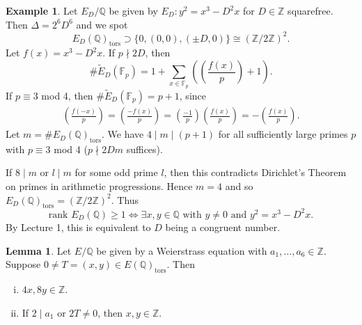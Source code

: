 \documentclass{article}
\theoremstyle{definition}
\newtheorem{lemma}[theorem]{Lemma}
\newtheorem{example}{Example}[section]
\begin{document}
\begin{example}
    Let $E_D/\mathbb{Q}$ be given by $E_D: y^2=x^3-D^2x$ for $D \in \mathbb{Z}$ squarefree. Then $\Delta=2^6 D^6$ and we spot \[
    E_D(\mathbb{Q})_{\text{tors}} \supset \{0, (0,0), (\pm D,0)\} \cong (\mathbb{Z}/2\mathbb{Z})^2.
    \]
    Let $f(x)=x^3-D^2x$. If $p \nmid 2D$, then $$\# \widetilde{E}_D(\mathbb{F}_p) = 1 + \sum_{x \in \mathbb{F}_p}^{} \left(\left(\frac{f(x)}{p}\right)+1\right).$$ If $p \equiv 3$ mod 4, then $\# \widetilde{E}_D(\mathbb{F}_p)=p+1$, since 
    \begin{align*}
        \left( \frac{f(-x)}{p} \right) = \left( \frac{-f(x)}{p} \right) = \left( \frac{-1}{p} \right) \left( \frac{f(x)}{p} \right) = - \left( \frac{f(x)}{p} \right).
    \end{align*}
    Let $m = \#E_D(\mathbb{Q})_{\text{tors}}$. We have $4 \mid m \mid (p+1)$ for all sufficiently large primes $p$ with $p \equiv 3$ mod 4 ($p \nmid 2Dm$ suffices).
    \vspace{1mm}
     
    If $8 \mid m$ or $l \mid m$ for some odd prime $l$, then this contradicts Dirichlet's Theorem on primes in arithmetic progressions. Hence $m=4$ and so $E_D(\mathbb{Q})_{\text{tors}} = (\mathbb{Z}/2\mathbb{Z})^2$. Thus 
    \[
    \text{rank }E_D(\mathbb{Q})\ge 1 \iff \exists x,y \in \mathbb{Q} \text{ with }y\neq 0 \text{ and }y^2=x^3-D^2x.
    \]
    By Lecture 1, this is equivalent to $D$ being a congruent number.
\end{example}
\begin{lemma}\label{lemma10.4}
    Let $E/\mathbb{Q}$ be given by a Weierstrass equation with $a_1,\ldots,a_6 \in \mathbb{Z}$. Suppose $0 \neq T = (x,y) \in E(\mathbb{Q})_{\text{tors}}$. Then
    \begin{enumerate}[(i)]
        \item $4x,8y \in \mathbb{Z}$.
        \item If $2 \mid a_1$ or $2T \neq 0$, then $x,y \in \mathbb{Z}$.
    \end{enumerate}
\end{lemma}
\end{document}
